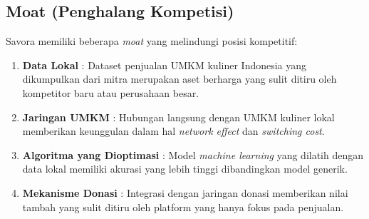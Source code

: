 \subsection{Moat (Penghalang Kompetisi)}

Savora memiliki beberapa \textit{moat} yang melindungi posisi kompetitif:

\begin{enumerate}[leftmargin=*]
    \item \textbf{Data Lokal} : Dataset penjualan UMKM kuliner Indonesia yang dikumpulkan dari mitra merupakan aset berharga yang sulit ditiru oleh kompetitor baru atau perusahaan besar.
    
    \item \textbf{Jaringan UMKM} : Hubungan langsung dengan UMKM kuliner lokal memberikan keunggulan dalam hal \textit{network effect} dan \textit{switching cost}.
    
    \item \textbf{Algoritma yang Dioptimasi} : Model \textit{machine learning} yang dilatih dengan data lokal memiliki akurasi yang lebih tinggi dibandingkan model generik.
    
    \item \textbf{Mekanisme Donasi} : Integrasi dengan jaringan donasi memberikan nilai tambah yang sulit ditiru oleh platform yang hanya fokus pada penjualan.
\end{enumerate}
